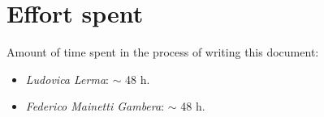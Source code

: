 \section{Effort spent}
\label{sect:effortspent}

Amount of time spent in the process of writing this document:
\begin{itemize}
    \item \textit{Ludovica Lerma}: $\sim$ 48 h.
    \item \textit{Federico Mainetti Gambera}: $\sim$ 48 h.
\end{itemize}
